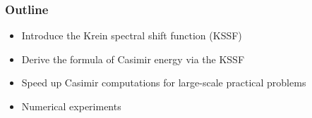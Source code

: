 \documentclass[dvipsnames,10pt]{beamer}
\begin{document}
\begin{frame}
    \frametitle{Outline}
\begin{itemize}
    \item Introduce the Krein spectral shift function (KSSF)
    \vspace{0.3cm}
    \item Derive the formula of Casimir energy via the KSSF
    \vspace{0.3cm}
    \item Speed up Casimir computations for large-scale practical problems
    \vspace{0.3cm}
    \item Numerical experiments 
\end{itemize}

\end{frame}
\end{document}
